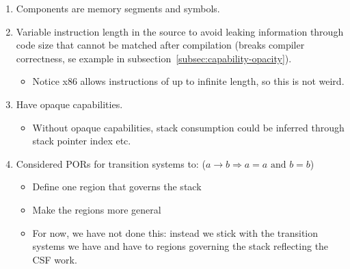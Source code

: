 \documentclass[a4paper]{article}
\begin{document}
\begin{enumerate}
\item Components are memory segments and symbols.
\item Variable instruction length in the source to avoid leaking information through code size that cannot be matched after compilation (breaks compiler correctness, se example in subsection~\ref{subsec:capability-opacity}).
  \begin{itemize}
  \item Notice x86 allows instructions of up to infinite length, so this is not weird.
  \end{itemize}
\item Have opaque capabilities.
  \begin{itemize}
  \item Without opaque capabilities, stack consumption could be inferred through stack pointer index etc.
  \end{itemize}
\item Considered PORs for transition systems to: ($a \rightarrow b \Rightarrow a = a \text{ and } b = b$)
  \begin{itemize}
  \item Define one region that governs the stack
  \item Make the regions more general
  \item For now, we have not done this: instead we stick with the transition systems we have and have to regions governing the stack reflecting the CSF work.
  \end{itemize}
\end{enumerate}
\end{document}
